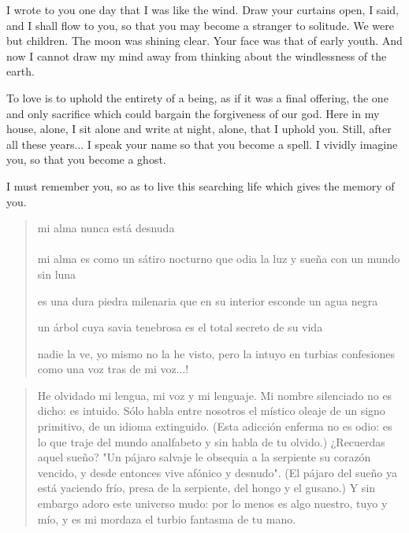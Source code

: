 \documentclass[a4paper, 12pt]{article}
\begin{document}
I wrote to you one day that I was like the wind. Draw your curtains open, I
said, and I shall flow to you, so that you may become a stranger to solitude. 
We were but children. The moon was shining clear. Your face was that of early
youth. And now I cannot draw my mind away from thinking about the windlessness of
the earth.

To love is to uphold the entirety of a being, as if it was a final offering, the
one and only sacrifice which could bargain the forgiveness of our god. Here in
my house, alone, I sit alone and write at night, alone, that I uphold you.
Still, after all these years... I speak your name so that you become a spell. I
vividly imagine you, so that you become a ghost. 

I must remember you, so as to live this searching life which gives the memory of
you.

\pagebreak 

\begin{verse}
    
mi alma nunca está desnuda\\

\\ 

mi alma es como un sátiro nocturno
que odia la luz y sueña con un mundo sin luna

es una dura piedra milenaria
que en su interior esconde un agua negra

un árbol cuya savia tenebrosa
es el total secreto de su vida

nadie la ve, yo mismo no la he visto,
pero la intuyo en turbias confesiones
como una voz tras de mi voz...!





\end{verse}

\pagebreak

\begin{verse}
    He olvidado mi lengua, mi voz y mi lenguaje.
    Mi nombre silenciado no es dicho: es intuido.
    Sólo habla entre nosotros el místico oleaje 
    de un signo primitivo, de un idioma extinguido.
    (Esta adicción enferma no es odio: es lo que traje
    del mundo analfabeto y sin habla de tu olvido.)
    ¿Recuerdas aquel sueño? "Un pájaro salvaje 
    le obsequia a la serpiente su corazón vencido,
    y desde entonces vive afónico y desnudo".
    (El pájaro del sueño ya está yaciendo frío,
    presa de la serpiente, del hongo y el gusano.)
    Y sin embargo adoro este universo mudo:
    por lo menos es algo nuestro, tuyo y mío,
    y es mi mordaza el turbio fantasma de tu mano.
    \end{verse}
\end{document}
